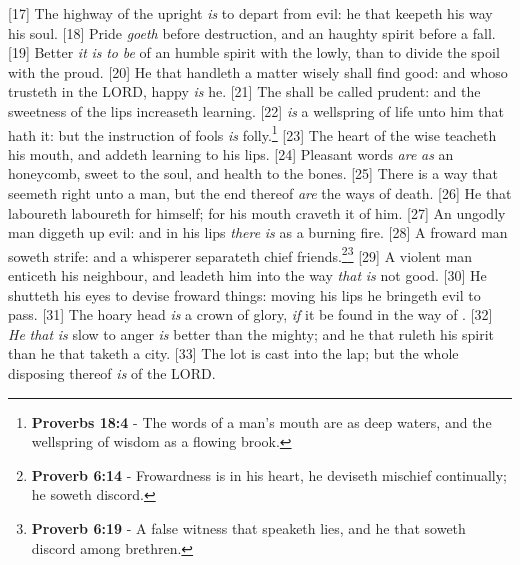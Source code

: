 [17] \textcolor[cmyk]{0.99998,1,0,0}{The highway of the upright \emph{is} to depart from evil: he that keepeth his way  his soul.}
[18] \textcolor[cmyk]{0.99998,1,0,0}{Pride \emph{goeth} before destruction, and an haughty spirit before a fall.}
[19] \textcolor[cmyk]{0.99998,1,0,0}{Better \emph{it} \emph{is} \emph{to} \emph{be} of an humble spirit with the lowly, than to divide the spoil with the proud.}
[20] \textcolor[cmyk]{0.99998,1,0,0}{He that handleth a matter wisely shall find good: and whoso trusteth in the LORD, happy \emph{is} he.}
[21] \textcolor[cmyk]{0.99998,1,0,0}{The  shall be called prudent: and the sweetness of the lips increaseth learning.}
[22] \textcolor[cmyk]{0.99998,1,0,0}{ \emph{is} a wellspring of life unto him that hath it: but the instruction of fools \emph{is} folly.}\footnote{\textbf{Proverbs 18:4} - The words of a man’s mouth are as deep waters, and the wellspring of wisdom as a flowing brook.}\marginpar{ \scriptsize  {\textcolor[rgb]{0.00,0.545,0.269}{$\rightarrow$``wellspring'' found ONLY here and in Proverbs 18:4.}}}
[23] \textcolor[cmyk]{0.99998,1,0,0}{The heart of the wise teacheth his mouth, and addeth learning to his lips.}
[24] \textcolor[cmyk]{0.99998,1,0,0}{Pleasant words \emph{are} \emph{as} an honeycomb, sweet to the soul, and health to the bones.}
[25] \textcolor[cmyk]{0.99998,1,0,0}{There is a way that seemeth right unto a man, but the end thereof \emph{are} the ways of death.}
[26] \textcolor[cmyk]{0.99998,1,0,0}{He that laboureth laboureth for himself; for his mouth craveth it of him.}
[27] \textcolor[cmyk]{0.99998,1,0,0}{An ungodly man diggeth up evil: and in his lips \emph{there} \emph{is} as a burning fire.}
[28] \textcolor[cmyk]{0.99998,1,0,0}{A froward man soweth strife: and a whisperer separateth chief friends.}\footnote{\textbf{Proverb 6:14} - Frowardness is in his heart, he deviseth mischief continually; he soweth discord.}\footnote{\textbf{Proverb 6:19} - A false witness that speaketh lies, and he that soweth discord among brethren.}
[29] \textcolor[cmyk]{0.99998,1,0,0}{A violent man enticeth his neighbour, and leadeth him into the way \emph{that} \emph{is} not good.}
[30] \textcolor[cmyk]{0.99998,1,0,0}{He shutteth his eyes to devise froward things: moving his lips he bringeth evil to pass.}
[31] \textcolor[cmyk]{0.99998,1,0,0}{The hoary head \emph{is} a crown of glory, \emph{if} it be found in the way of .}
[32] \textcolor[cmyk]{0.99998,1,0,0}{\emph{He} \emph{that} \emph{is} slow to anger \emph{is} better than the mighty; and he that ruleth his spirit than he that taketh a city.}
[33] \textcolor[cmyk]{0.99998,1,0,0}{The lot is cast into the lap; but the whole disposing thereof \emph{is} of the LORD.}


